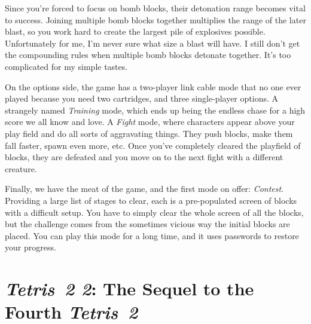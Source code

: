 \documentclass{book}
\let\oldcenter\center
\let\oldendcenter\endcenter
\renewenvironment{center}{\setlength\topsep{0pt}\oldcenter}{\oldendcenter}
\begin{document}
Since you’re forced to focus on bomb blocks, their detonation range becomes vital to success. Joining multiple bomb blocks together multiplies the range of the later blast, so you work hard to create the largest pile of explosives possible. Unfortunately for me, I’m never sure what size a blast will have. I still don’t get the compounding rules when multiple bomb blocks detonate together. It’s too complicated for my simple tastes.

On the options side, the game has a two-player link cable mode that no one ever played because you need two cartridges, and three single-player options. A strangely named \emph{Training} mode, which ends up being the endless chase for a high score we all know and love. A \emph{Fight} mode, where characters appear above your play field and do all sorts of aggravating things. They push blocks, make them fall faster, spawn even more, etc. Once you’ve completely cleared the playfield of blocks, they are defeated and you move on to the next fight with a different creature.

\begin{center}
\vspace{8pt}
\quad\vspace{4pt}
\quad\vspace{4pt}
\quad\vspace{4pt}
\quad\vspace{4pt}
\end{center}

Finally, we have the meat of the game, and the first mode on offer: \emph{Contest}. Providing a large list of stages to clear, each is a pre-populated screen of blocks with a difficult setup. You have to simply clear the whole screen of all the blocks, but the challenge comes from the sometimes vicious way the initial blocks are placed. You can play this mode for a long time, and it uses passwords to restore your progress.

\FloatBarrier\needspace{10mm}\section*{\emph{Tetris 2 2}: The Sequel to the Fourth \emph{Tetris 2}}\nopagebreak[4]
\end{document}
